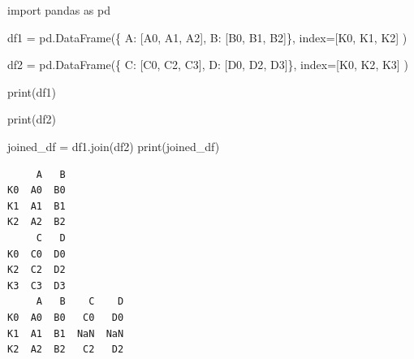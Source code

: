 \documentclass[
  english,
  letterpaper,
  DIV=11,
  numbers=noendperiod]{scrreprt}
\newenvironment{Shaded}{\begin{snugshade}}{\end{snugshade}}
\newcommand{\BuiltInTok}[1]{\textcolor[rgb]{0.00,0.23,0.31}{#1}}
\newcommand{\ImportTok}[1]{\textcolor[rgb]{0.00,0.46,0.62}{#1}}
\newcommand{\NormalTok}[1]{\textcolor[rgb]{0.00,0.23,0.31}{#1}}
\newcommand{\OperatorTok}[1]{\textcolor[rgb]{0.37,0.37,0.37}{#1}}
\newcommand{\StringTok}[1]{\textcolor[rgb]{0.13,0.47,0.30}{#1}}
\begin{document}
\begin{Shaded}
\begin{Highlighting}[]
\ImportTok{import}\NormalTok{ pandas }\ImportTok{as}\NormalTok{ pd}

\NormalTok{df1 }\OperatorTok{=}\NormalTok{ pd.DataFrame(\{}
    \StringTok{\textquotesingle{}A\textquotesingle{}}\NormalTok{: [}\StringTok{\textquotesingle{}A0\textquotesingle{}}\NormalTok{, }\StringTok{\textquotesingle{}A1\textquotesingle{}}\NormalTok{, }\StringTok{\textquotesingle{}A2\textquotesingle{}}\NormalTok{],}
    \StringTok{\textquotesingle{}B\textquotesingle{}}\NormalTok{: [}\StringTok{\textquotesingle{}B0\textquotesingle{}}\NormalTok{, }\StringTok{\textquotesingle{}B1\textquotesingle{}}\NormalTok{, }\StringTok{\textquotesingle{}B2\textquotesingle{}}\NormalTok{]\},}
\NormalTok{    index}\OperatorTok{=}\NormalTok{[}\StringTok{\textquotesingle{}K0\textquotesingle{}}\NormalTok{, }\StringTok{\textquotesingle{}K1\textquotesingle{}}\NormalTok{, }\StringTok{\textquotesingle{}K2\textquotesingle{}}\NormalTok{]}
\NormalTok{)}

\NormalTok{df2 }\OperatorTok{=}\NormalTok{ pd.DataFrame(\{}
    \StringTok{\textquotesingle{}C\textquotesingle{}}\NormalTok{: [}\StringTok{\textquotesingle{}C0\textquotesingle{}}\NormalTok{, }\StringTok{\textquotesingle{}C2\textquotesingle{}}\NormalTok{, }\StringTok{\textquotesingle{}C3\textquotesingle{}}\NormalTok{],}
    \StringTok{\textquotesingle{}D\textquotesingle{}}\NormalTok{: [}\StringTok{\textquotesingle{}D0\textquotesingle{}}\NormalTok{, }\StringTok{\textquotesingle{}D2\textquotesingle{}}\NormalTok{, }\StringTok{\textquotesingle{}D3\textquotesingle{}}\NormalTok{]\},}
\NormalTok{    index}\OperatorTok{=}\NormalTok{[}\StringTok{\textquotesingle{}K0\textquotesingle{}}\NormalTok{, }\StringTok{\textquotesingle{}K2\textquotesingle{}}\NormalTok{, }\StringTok{\textquotesingle{}K3\textquotesingle{}}\NormalTok{]}
\NormalTok{)}

\BuiltInTok{print}\NormalTok{(df1)}

\BuiltInTok{print}\NormalTok{(df2)}

\NormalTok{joined\_df }\OperatorTok{=}\NormalTok{ df1.join(df2)}
\BuiltInTok{print}\NormalTok{(joined\_df)}
\end{Highlighting}
\end{Shaded}

\begin{verbatim}
     A   B
K0  A0  B0
K1  A1  B1
K2  A2  B2
     C   D
K0  C0  D0
K2  C2  D2
K3  C3  D3
     A   B    C    D
K0  A0  B0   C0   D0
K1  A1  B1  NaN  NaN
K2  A2  B2   C2   D2
\end{verbatim}
\end{document}
